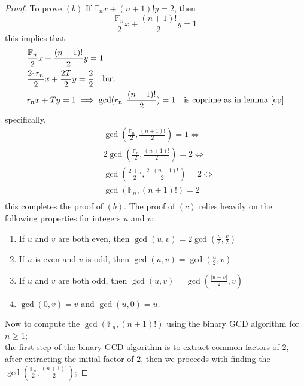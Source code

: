 \documentclass[pdflatex,sn-mathphys-num]{sn-jnl}%
\theoremstyle{thmstyleone}%
\theoremstyle{thmstyletwo}%
\theoremstyle{thmstylethree}%
\begin{document}
\begin{proof}
To prove $(b)$ If $\mathbb{F}_{n} x + (n+1)! y=2$, then $$ \dfrac{\mathbb{F}_{n}}{2} x + \dfrac{(n+1)!}{2} y=1$$ this implies that
\begin{align*}
    &\dfrac{\mathbb{F}_{n}}{2} x + \dfrac{(n+1)!}{2} y=1\\
    &\dfrac{2\cdotp r_{n}}{2} x + \dfrac{2T}{2}y =\dfrac{2}{2} \quad \mbox{but}\\
    &r_n x + T y=1 \implies \gcd(r_{n},\frac{(n+1)!}{2})=1 \quad \mbox{is coprime as in lemma \ref{cp}}
\end{align*}
specifically,
\begin{align*}
    &\gcd\left(\frac{\mathbb{F}_{n}}{2}, \frac{(n+1)!}{2}\right)=1 \iff\\
    &2\gcd\left(\frac{\mathbb{F}_{n}}{2}, \frac{(n+1)!}{2}\right)=2 \iff \\
    &\gcd\left(\frac{2\cdotp \mathbb{F}_{n}}{2}, \frac{2 \cdotp (n+1)!}{2}\right)=2 \iff \\
    &\gcd(\mathbb{F}_{n},(n+1)!)=2 \\
\end{align*}
this completes the proof of $(b).$
The proof of $(c)$ relies heavily on the following properties \cite{stein1967computational, knuth2014art} for integers $u$ and $v$;
\begin{enumerate}
    \item  If $u$ and $v$ are both even, then $\gcd(u,v)=2\gcd\left(\frac{u}{2}, \frac{v}{2}\right)$
    \item  If $u$ is even and $v$ is odd, then $\gcd(u,v)=\gcd\left(\frac{u}{2}, v\right)$
    \item  If $u$ and $v$ are both odd, then $\gcd(u,v)=\gcd\left(\frac{|u-v|}{2}, v\right)$
    \item  $\gcd(0,v)=v$ and $\gcd(u,0)=u$.
\end{enumerate}
Now to compute the $\gcd(\mathbb{F}_{n},(n+1)!)$ using the binary GCD algorithm for $n\geq 1;$ \\
the first step of the binary GCD algorithm is to extract common factors of $2$,\\
after extracting the initial factor of $2$, then we proceeds with finding the $\gcd\left(\frac{\mathbb{F}_{n}}{2} , \frac{(n+1)!}{2}\right)$;

\end{proof}
\end{document}
